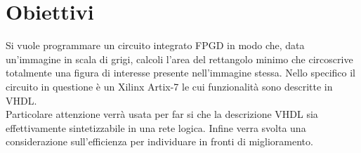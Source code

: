 \chapter{Obiettivi}

Si vuole programmare un circuito integrato FPGD in modo che, data un’immagine in scala di grigi, calcoli l’area del rettangolo minimo che circoscrive totalmente una figura di interesse presente nell’immagine stessa. Nello specifico il circuito in questione è un Xilinx Artix-7 le cui funzionalità sono descritte in VHDL.\\
Particolare attenzione verrà usata per far si che la descrizione VHDL sia effettivamente sintetizzabile in una rete logica. Infine verra svolta una considerazione sull'efficienza per individuare in fronti di miglioramento.